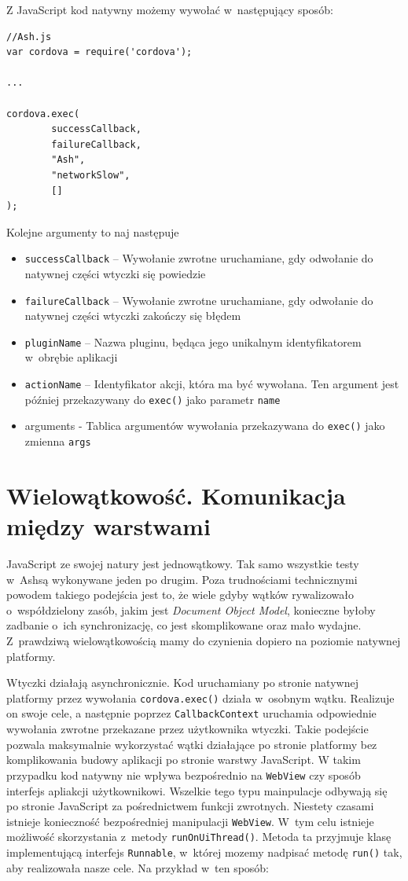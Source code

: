 \documentclass[brudnopis]{xmgr}
\begin{document}
Z JavaScript kod natywny możemy wywołać w~następujący sposób:

\begin{lstlisting}
//Ash.js
var cordova = require('cordova');

...

cordova.exec( 
        successCallback,
        failureCallback, 
        "Ash", 
        "networkSlow", 
        []
);
\end{lstlisting}

Kolejne argumenty to naj następuje
\begin{itemize}
  \item \texttt{successCallback} -- Wywołanie zwrotne uruchamiane, gdy odwołanie do natywnej części wtyczki się powiedzie
  \item \texttt{failureCallback} -- Wywołanie zwrotne uruchamiane, gdy odwołanie do natywnej części wtyczki zakończy się błędem
  \item \texttt{pluginName} -- Nazwa pluginu, będąca jego unikalnym identyfikatorem w~obrębie aplikacji
  \item \texttt{actionName} -- Identyfikator akcji, która ma być wywołana. Ten argument jest później przekazywany do \texttt{exec()} jako parametr \texttt{name} 
\item arguments - Tablica argumentów wywołania przekazywana do \texttt{exec()} jako zmienna \texttt{args} 
\end{itemize}

\section{Wielowątkowość. Komunikacja między warstwami}

JavaScript ze swojej natury jest jednowątkowy. Tak samo wszystkie testy w~Ashsą wykonywane jeden po drugim. Poza trudnościami technicznymi powodem takiego podejścia jest to, że wiele gdyby wątków rywalizowało o~współdzielony zasób, jakim jest \textit{Document Object Model}, konieczne byłoby zadbanie o~ich synchronizację, co jest skomplikowane oraz mało wydajne. Z~prawdziwą wielowątkowością mamy do czynienia dopiero na poziomie natywnej platformy.

Wtyczki działają asynchronicznie. Kod uruchamiany po stronie natywnej platformy przez wywołania \texttt{cordova.exec()} działa w~osobnym wątku. Realizuje on swoje cele, a następnie poprzez \texttt{CallbackContext} uruchamia odpowiednie wywołania zwrotne przekazane przez użytkownika wtyczki. Takie podejście pozwala maksymalnie wykorzystać wątki działające po stronie platformy bez komplikowania budowy aplikacji po stronie warstwy JavaScript. W takim przypadku kod natywny nie wpływa bezpośrednio na \texttt{WebView} czy sposób interfejs apliakcji użytkownikowi. Wszelkie tego typu mainpulacje odbywają się po stronie JavaScript za pośrednictwem funkcji zwrotnych. Niestety czasami istnieje konieczność bezpośredniej manipulacji \texttt{WebView}. W~tym celu istnieje możliwość skorzystania z~metody \texttt{runOnUiThread()}. Metoda ta przyjmuje klasę implementującą interfejs \texttt{Runnable}, w~której mozemy nadpisać metodę \texttt{run()} tak, aby realizowała nasze cele. Na przykład w~ten sposób:
\end{document}
